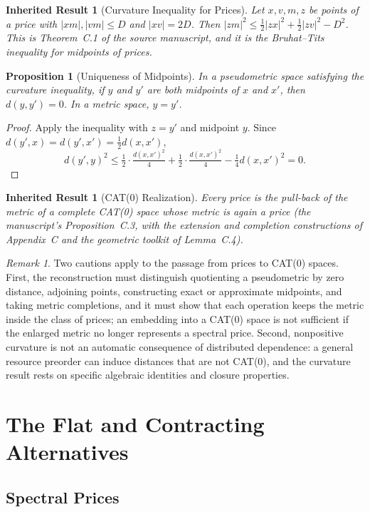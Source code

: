 \documentclass[11pt,letterpaper]{report}
\theoremstyle{plain}
\newtheorem{proposition}[theorem]{Proposition}
\newtheorem{inherited}[theorem]{Inherited Result}
\theoremstyle{definition}
\theoremstyle{remark}
\newtheorem{remark}[theorem]{Remark}
\begin{document}
\begin{inherited}[Curvature Inequality for Prices]\label{inh:cn}
Let $x,v,m,z$ be points of a price with $|xm|,|vm|\le D$ and $|xv|=2D$. Then $|zm|^2\le\tfrac12|zx|^2+\tfrac12|zv|^2-D^2$. This is Theorem~C.1 of the source manuscript, and it is the Bruhat--Tits inequality for midpoints of prices.
\end{inherited}

\begin{proposition}[Uniqueness of Midpoints]
In a pseudometric space satisfying the curvature inequality, if $y$ and $y'$ are both midpoints of $x$ and $x'$, then $d(y,y')=0$. In a metric space, $y=y'$.
\end{proposition}
\begin{proof}
Apply the inequality with $z=y'$ and midpoint $y$. Since $d(y',x)=d(y',x')=\tfrac12d(x,x')$,
\[
d(y',y)^2\le\tfrac12\cdot\tfrac{d(x,x')^2}{4}+\tfrac12\cdot\tfrac{d(x,x')^2}{4}-\tfrac14d(x,x')^2=0.
\]
\end{proof}

\begin{inherited}[CAT(0) Realization]
Every price is the pull-back of the metric of a complete CAT(0) space whose metric is again a price (the manuscript's Proposition~C.3, with the extension and completion constructions of Appendix~C and the geometric toolkit of Lemma~C.4).
\end{inherited}

\begin{remark}
Two cautions apply to the passage from prices to CAT(0) spaces. First, the reconstruction must distinguish quotienting a pseudometric by zero distance, adjoining points, constructing exact or approximate midpoints, and taking metric completions, and it must show that each operation keeps the metric inside the class of prices; an embedding into a CAT(0) space is not sufficient if the enlarged metric no longer represents a spectral price. Second, nonpositive curvature is not an automatic consequence of distributed dependence: a general resource preorder can induce distances that are not CAT(0), and the curvature result rests on specific algebraic identities and closure properties.
\end{remark}

\chapter{The Flat and Contracting Alternatives}

\section{Spectral Prices}
\end{document}
